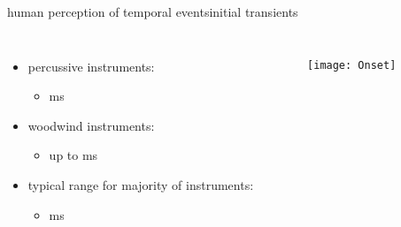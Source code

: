         \begin{frame}{human perception of temporal events}{initial transients}
            \begin{columns}
                \begin{itemize}
                    \item	percussive instruments:
                    \begin{itemize}
                        \item   \unit[3-20]{ms}
                    \end{itemize}
                    \smallskip
                    \item	woodwind instruments:
                    \begin{itemize}
                        \item   up to \unit[300]{ms}
                    \end{itemize}
                    \bigskip
                    \item<2->	typical range for majority of instruments:
                    \begin{itemize}
                        \item   \unit[15--50]{ms}
                    \end{itemize}
                \end{itemize}
                \begin{figure}
                \texttt{[image: Onset]}
                \end{figure}            
            \end{columns}
        \end{frame}
